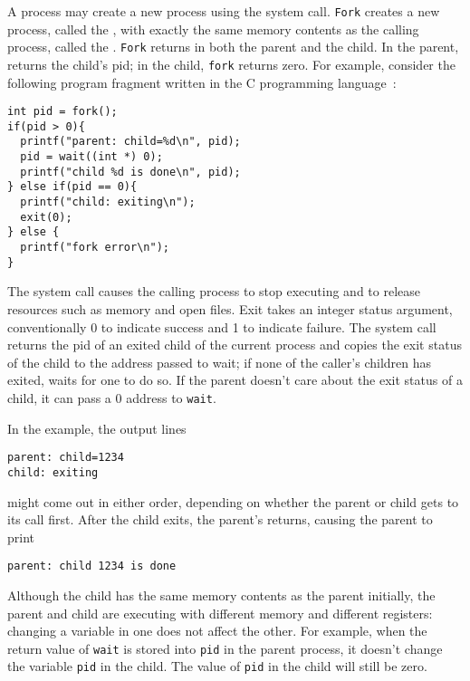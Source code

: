 A process may create a new process using the
system call.
\lstinline{Fork}
creates a new process, called the 
, 
with exactly the same memory contents
as the calling process, called the 
.
\lstinline{Fork}
returns in both the parent and the child.
In the parent,
returns the child's pid;
in the child, \lstinline{fork} returns zero.
For example, consider the following program fragment written in the C
programming language~\cite{kernighan}:
\begin{lstlisting}[]
int pid = fork();
if(pid > 0){
  printf("parent: child=%d\n", pid);
  pid = wait((int *) 0);
  printf("child %d is done\n", pid);
} else if(pid == 0){
  printf("child: exiting\n");
  exit(0);
} else {
  printf("fork error\n");
}
\end{lstlisting}
The
system call causes the calling process to stop executing and
to release resources such as memory and open files.
Exit takes an integer status argument,
conventionally 0 to indicate success and 1 to indicate failure.
The
system call returns the pid of an exited child of the
current process and copies the exit status of the child to the address
passed to wait; if none of the caller's children
has exited,
waits for one to do so.
If the parent doesn't care about the exit status of a child, it can
pass a 0 address to
\lstinline{wait}.

In the example, the output lines
\begin{lstlisting}[]
parent: child=1234
child: exiting
\end{lstlisting}
might come out in either order, depending on whether the
parent or child gets to its
call first.
After the child exits, the parent's
returns, causing the parent to print
\begin{lstlisting}[]
parent: child 1234 is done
\end{lstlisting}
Although the child has the same memory contents as the parent initially, the
parent and child are executing with different memory and different registers:
changing a variable in one does not affect the other. For example, when the
return value of
\lstinline{wait}
is stored into
\lstinline{pid} 
in the parent process,
it doesn't change the variable 
\lstinline{pid}
in the child.  The value of
\lstinline{pid}
in the child will still be zero.

